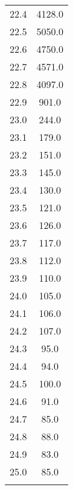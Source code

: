 \begin{table}
{\begin{tabular}{S S}
        22.4 & 4128.0 \\
        22.5 & 5050.0 \\
        22.6 & 4750.0 \\
        22.7 & 4571.0 \\
        22.8 & 4097.0 \\
        22.9 & 901.0 \\
        23.0 & 244.0 \\
        23.1 & 179.0 \\
        23.2 & 151.0 \\
        23.3 & 145.0 \\
        23.4 & 130.0 \\
        23.5 & 121.0 \\
        23.6 & 126.0 \\
        23.7 & 117.0 \\
        23.8 & 112.0 \\
        23.9 & 110.0 \\
        24.0 & 105.0 \\
        24.1 & 106.0 \\
        24.2 & 107.0 \\
        24.3 & 95.0 \\
        24.4 & 94.0 \\
        24.5 & 100.0 \\
        24.6 & 91.0 \\
        24.7 & 85.0 \\
        24.8 & 88.0 \\
        24.9 & 83.0 \\
        25.0 & 85.0 \\
        & \\
        \bottomrule
    \end{tabular}
    }
    \label{tab:emission}
\end{table}

